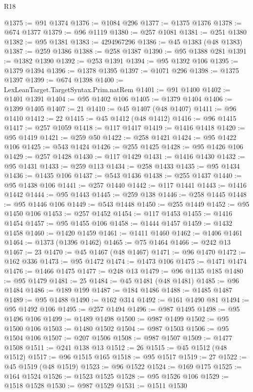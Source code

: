 \begin{lexlean}{R18}
\begin{coremodule}
@1375 := @91 @1374
@1376 := @1084 @296
@1377 := @1375 @1376
@1378 := @674 @1377
@1379 := @96 @1119
@1380 := @257 @1081
@1381 := @251 @1380
@1382 := @95 @1381
@1383 := 4294967296
@1386 := @45 @1383 (@48 @1383)
@1387 := @259 @1386
@1388 := @258 @1387
@1390 := @95 @1388 @281
@1391 := @1382 @1390
@1392 := @253 @1391
@1394 := @95 @1392 @106
@1395 := @1379 @1394
@1396 := @1378 @1395
@1397 := @1071 @296
@1398 := @1375 @1397
@1399 := @674 @1398
@1400 := LexLeanTarget.TargetSyntax.Prim.natRem
@1401 := @91 @1400
@1402 := @1401 @1391
@1404 := @95 @1402 @106
@1405 := @1379 @1404
@1406 := @1399 @1405
@1407 := 21
@1410 := @45 @1407 (@48 @1407)
@1411 := @96 @1410
@1412 := 22
@1415 := @45 @1412 (@48 @1412)
@1416 := @96 @1415
@1417 := @257 @1059
@1418 := @117 @1417
@1419 := @1416 @1418
@1420 := @95 @1419
@1421 := @259 @50
@1422 := @258 @1421
@1424 := @95 @1422 @106
@1425 := @543 @1424
@1426 := @255 @1425
@1428 := @95 @1426 @106
@1429 := @257 @1428
@1430 := @117 @1429
@1431 := @1416 @1430
@1432 := @95 @1431
@1433 := @259 @113
@1434 := @258 @1433
@1435 := @95 @1434
@1436 := @1435 @106
@1437 := @543 @1436
@1438 := @255 @1437
@1440 := @95 @1438 @106
@1441 := @257 @1440
@1442 := @117 @1441
@1443 := @1416 @1442
@1444 := @95 @1443
@1445 := @259 @138
@1446 := @258 @1445
@1448 := @95 @1446 @106
@1449 := @543 @1448
@1450 := @255 @1449
@1452 := @95 @1450 @106
@1453 := @257 @1452
@1454 := @117 @1453
@1455 := @1416 @1454
@1457 := @95 @1455 @106
@1458 := @1444 @1457
@1459 := @1432 @1458
@1460 := @1420 @1459
@1461 := @1411 @1460
@1462 := @1406 @1461
@1464 := @1373 (@1396 @1462)
@1465 := @75 @1464
@1466 := @242 @13
@1467 := 23
@1470 := @45 @1467 (@48 @1467)
@1471 := @96 @1470
@1472 := @162 @336
@1473 := @95 @1472
@1474 := @1473 @106
@1475 := @1471 @1474
@1476 := @1466 @1475
@1477 := @248 @13
@1479 := @96 @1135 @185
@1480 := @95 @1479
@1481 := 25
@1484 := @45 @1481 (@48 @1481)
@1485 := @96 @1484
@1486 := @189 @199
@1487 := @184 @1486
@1488 := @1485 @1487
@1489 := @95 @1488
@1490 := @162 @314
@1492 := @161 @1490 @81
@1494 := @95 @1492 @106
@1495 := @257 @1494
@1496 := @987 @1495
@1498 := @95 @1496 @106
@1499 := @1489 @1498
@1500 := @987 @1499
@1502 := @95 @1500 @106
@1503 := @1480 @1502
@1504 := @987 @1503
@1506 := @95 @1504 @106
@1507 := @207 @1506
@1508 := @987 @1507
@1509 := @1477 @1508
@1511 := @241 @138 @13
@1512 := 26
@1515 := @45 @1512 (@48 @1512)
@1517 := @96 @1515 @165
@1518 := @95 @1517
@1519 := 27
@1522 := @45 @1519 (@48 @1519)
@1523 := @96 @1522
@1524 := @169 @175
@1525 := @164 @1524
@1526 := @1523 @1525
@1528 := @95 @1526 @106
@1529 := @1518 @1528
@1530 := @987 @1529
@1531 := @1511 @1530

\end{coremodule}
\end{lexlean}
